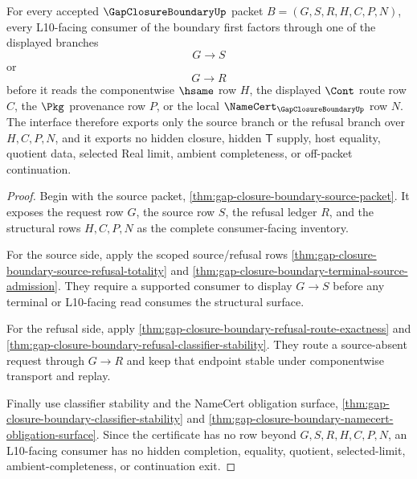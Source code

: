 \begin{theorem}
\label{thm:gap-closure-boundary-l10-route-consumer-interface}
For every accepted $\GapClosureBoundaryUp$ packet $B=(G,S,R,H,C,P,N)$, every L10-facing consumer of the boundary first factors through one of the displayed branches
$$
G \longrightarrow S
$$
or
$$
G \longrightarrow R
$$
before it reads the componentwise $\hsame$ row $H$, the displayed $\Cont$ route row $C$, the $\Pkg$ provenance row $P$, or the local $\NameCert_{\GapClosureBoundaryUp}$ row $N$. The interface therefore exports only the source branch or the refusal branch over $H,C,P,N$, and it exports no hidden closure, hidden $\mathsf{T}$ supply, host equality, quotient data, selected Real limit, ambient completeness, or off-packet continuation.
\end{theorem}
\begin{proof}
Begin with the source packet, \autoref{thm:gap-closure-boundary-source-packet}. It exposes the request row $G$, the source row $S$, the refusal ledger $R$, and the structural rows $H,C,P,N$ as the complete consumer-facing inventory.

For the source side, apply the scoped source/refusal rows \autoref{thm:gap-closure-boundary-source-refusal-totality} and \autoref{thm:gap-closure-boundary-terminal-source-admission}. They require a supported consumer to display $G \longrightarrow S$ before any terminal or L10-facing read consumes the structural surface.

For the refusal side, apply \autoref{thm:gap-closure-boundary-refusal-route-exactness} and \autoref{thm:gap-closure-boundary-refusal-classifier-stability}. They route a source-absent request through $G \longrightarrow R$ and keep that endpoint stable under componentwise transport and replay.

Finally use classifier stability and the NameCert obligation surface, \autoref{thm:gap-closure-boundary-classifier-stability} and \autoref{thm:gap-closure-boundary-namecert-obligation-surface}. Since the certificate has no row beyond $G,S,R,H,C,P,N$, an L10-facing consumer has no hidden completion, equality, quotient, selected-limit, ambient-completeness, or continuation exit.
\end{proof}

